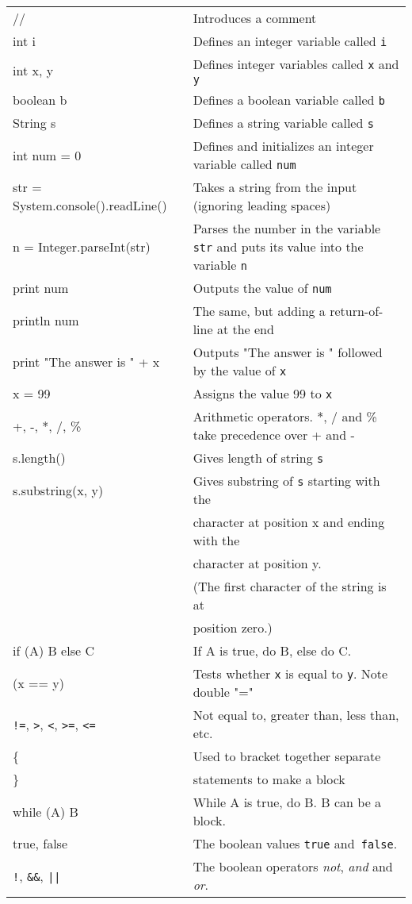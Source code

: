 
\begin{tabular}{p{6cm}p{7cm}}
// & Introduces a comment\\
int i & Defines an integer variable called \texttt{i}\\
int x, y & Defines integer variables called \texttt{x} and \texttt{y}\\
boolean b & Defines a boolean variable called \texttt{b}\\
String s & Defines a string variable called \texttt{s}\\
int num = 0 & Defines and initializes an integer variable called \texttt{num}\\
str = System.console().readLine() & Takes a string from the input
(ignoring leading spaces) \\
n = Integer.parseInt(str) & Parses the number in the variable
\texttt{str} and puts its value into the variable \texttt{n} \\
print num & Outputs the value of \texttt{num}\\
println num & The same, but adding a return-of-line at the end\\
print "The answer is " + x & Outputs "The answer is " followed by the value of \texttt{x}\\
x = 99 & Assigns the value 99 to \texttt{x}\\
+, -, *, /, \% & Arithmetic operators.  *, / and \% take precedence over + and -\\
s.length() & Gives length of string \texttt{s}\\
s.substring(x, y) & Gives substring of \texttt{s} starting with the \\
                  & character at position x and ending with the \\
                  & character at position y.\\
                  & (The first character of the string is at \\ 
                  & position zero.)\\
if (A) B else C   & If A is true, do B, else do C.\\
(x == y)          & Tests whether \texttt{x} is equal to \texttt{y}.  Note double "="\\
\verb+!=+, \verb+>+, \verb+<+, \verb+>=+, \verb+<=+ 
                  & Not equal to, greater than, less than, etc.\\
\{ & Used to bracket together separate \\ 
\} & statements to make a block\\
while (A) B & While A is true, do B.  B can be a block.\\
true, false & The boolean values \texttt{true} and\texttt{ false}.\\
\verb+!+, \verb+&&+, \verb+||+  & The boolean operators \emph{not}, \emph{and} and \emph{or}.\\
\end{tabular}
\vspace*{5pt}



